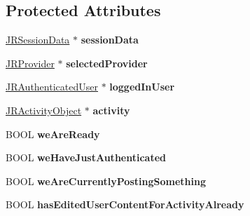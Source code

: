 \subsection*{Protected Attributes}
\begin{DoxyCompactItemize}
\item 
\hypertarget{interface_j_r_publish_activity_controller_ae60b301a1fe5cff88527358f05199026}{
\hyperlink{interface_j_r_session_data}{JRSessionData} $\ast$ {\bfseries sessionData}}
\label{interface_j_r_publish_activity_controller_ae60b301a1fe5cff88527358f05199026}

\item 
\hypertarget{interface_j_r_publish_activity_controller_a9a77a830ab992b49dc39e369edba387f}{
\hyperlink{interface_j_r_provider}{JRProvider} $\ast$ {\bfseries selectedProvider}}
\label{interface_j_r_publish_activity_controller_a9a77a830ab992b49dc39e369edba387f}

\item 
\hypertarget{interface_j_r_publish_activity_controller_aa33f1c7eed79ccc910adca5753110a73}{
\hyperlink{interface_j_r_authenticated_user}{JRAuthenticatedUser} $\ast$ {\bfseries loggedInUser}}
\label{interface_j_r_publish_activity_controller_aa33f1c7eed79ccc910adca5753110a73}

\item 
\hypertarget{interface_j_r_publish_activity_controller_a3abbf3814475368cab92c940253a1d12}{
\hyperlink{interface_j_r_activity_object}{JRActivityObject} $\ast$ {\bfseries activity}}
\label{interface_j_r_publish_activity_controller_a3abbf3814475368cab92c940253a1d12}

\item 
\hypertarget{interface_j_r_publish_activity_controller_a54cec56a3cbd35837447bbe36869806b}{
BOOL {\bfseries weAreReady}}
\label{interface_j_r_publish_activity_controller_a54cec56a3cbd35837447bbe36869806b}

\item 
\hypertarget{interface_j_r_publish_activity_controller_a1fca630de588f96afc8f56e889fb9fd1}{
BOOL {\bfseries weHaveJustAuthenticated}}
\label{interface_j_r_publish_activity_controller_a1fca630de588f96afc8f56e889fb9fd1}

\item 
\hypertarget{interface_j_r_publish_activity_controller_afb1c792c0ed0984046001944da7e1a70}{
BOOL {\bfseries weAreCurrentlyPostingSomething}}
\label{interface_j_r_publish_activity_controller_afb1c792c0ed0984046001944da7e1a70}

\item 
\hypertarget{interface_j_r_publish_activity_controller_a3a6ea6b2b4ae3651c98cbe3503cd158c}{
BOOL {\bfseries hasEditedUserContentForActivityAlready}}
\label{interface_j_r_publish_activity_controller_a3a6ea6b2b4ae3651c98cbe3503cd158c}


\end{DoxyCompactItemize}
